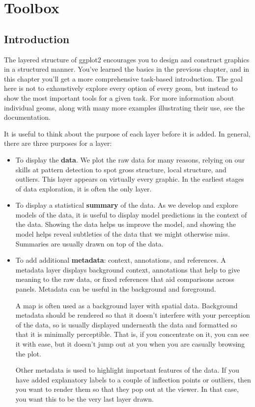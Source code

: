 \chapter{Toolbox}\label{cha:toolbox}

\section{Introduction}\label{introduction}

The layered structure of ggplot2 encourages you to design and construct
graphics in a structured manner. You've learned the basics in the
previous chapter, and in this chapter you'll get a more comprehensive
task-based introduction. The goal here is not to exhaustively explore
every option of every geom, but instead to show the most important tools
for a given task. For more information about individual geoms, along
with many more examples illustrating their use, see the documentation.

It is useful to think about the purpose of each layer before it is
added. In general, there are three purposes for a layer:

\begin{itemize}
\item
  To display the \textbf{data}. We plot the raw data for many reasons,
  relying on our skills at pattern detection to spot gross structure,
  local structure, and outliers. This layer appears on virtually every
  graphic. In the earliest stages of data exploration, it is often the
  only layer.
\item
  To display a statistical \textbf{summary} of the data. As we develop
  and explore models of the data, it is useful to display model
  predictions in the context of the data. Showing the data helps us
  improve the model, and showing the model helps reveal subtleties of
  the data that we might otherwise miss. Summaries are usually drawn on
  top of the data.
\item
  To add additional \textbf{metadata}: context, annotations, and
  references. A metadata layer displays background context, annotations
  that help to give meaning to the raw data, or fixed references that
  aid comparisons across panels. Metadata can be useful in the
  background and foreground.

  A map is often used as a background layer with spatial data.
  Background metadata should be rendered so that it doesn't interfere
  with your perception of the data, so is usually displayed underneath
  the data and formatted so that it is minimally perceptible. That is,
  if you concentrate on it, you can see it with ease, but it doesn't
  jump out at you when you are casually browsing the plot.

  Other metadata is used to highlight important features of the data. If
  you have added explanatory labels to a couple of inflection points or
  outliers, then you want to render them so that they pop out at the
  viewer. In that case, you want this to be the very last layer drawn.
\end{itemize}

